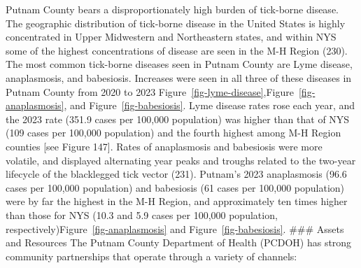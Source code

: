 \documentclass[
  english,
  letterpaper,
]{report}
\begin{document}
Putnam County bears a disproportionately high burden of tick-borne
disease. The geographic distribution of tick-borne disease in the United
States is highly concentrated in Upper Midwestern and Northeastern
states, and within NYS some of the highest concentrations of disease are
seen in the M-H Region (230). The most common tick-borne diseases seen
in Putnam County are Lyme disease, anaplasmosis, and babesiosis.
Increases were seen in all three of these diseases in Putnam County from
2020 to 2023
Figure~\ref{fig-lyme-disease},Figure~\ref{fig-anaplasmosis}, and
Figure~\ref{fig-babesiosis}. Lyme disease rates rose each year, and the
2023 rate (351.9 cases per 100,000 population) was higher than that of
NYS (109 cases per 100,000 population) and the fourth highest among M-H
Region counties {[}see Figure 147{]}. Rates of anaplasmosis and
babesiosis were more volatile, and displayed alternating year peaks and
troughs related to the two-year lifecycle of the blacklegged tick vector
(231). Putnam's 2023 anaplasmosis (96.6 cases per 100,000 population)
and babesiosis (61 cases per 100,000 population) were by far the highest
in the M-H Region, and approximately ten times higher than those for NYS
(10.3 and 5.9 cases per 100,000 population,
respectively)Figure~\ref{fig-anaplasmosis} and
Figure~\ref{fig-babesiosis}. \#\#\# Assets and Resources The Putnam
County Department of Health (PCDOH) has strong community partnerships
that operate through a variety of channels:
\end{document}
